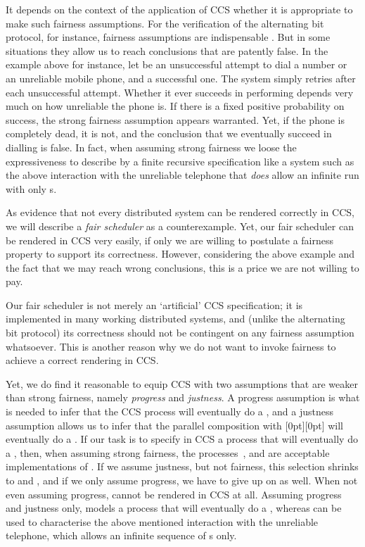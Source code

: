 \documentclass[smallcondensed]{svjour3}
\newcommand{\plat}[1]{\raisebox{0pt}[0pt][0pt]{#1}}  \def\precond#1{{\vphantom{#1}}^\bullet #1}
\begin{document}
\advance\textheight -1pt
It depends on the context of the application of CCS whether it is appropriate to make such fairness assumptions.
For the verification of the alternating bit protocol, for instance, fairness assumptions are
indispensable \cite{BergstraKlop85}. But in some situations they allow us to reach conclusions that are
patently false. In the example above for instance, let  be an unsuccessful attempt to dial a
number or an unreliable mobile phone, and  a successful one. The system  simply
retries after each unsuccessful attempt. Whether it ever succeeds in performing  depends very
much on how unreliable the phone is. If there is a fixed positive probability on success,
the strong fairness assumption appears warranted. Yet, if the phone is completely dead, it is not,
and the conclusion that we eventually succeed in dialling is false.
In fact, when assuming strong fairness we loose the expressiveness to describe by a finite
recursive specification like  a system such as the above interaction with the unreliable 
telephone that \emph{does} allow an infinite run with only s.

As evidence that not every distributed system can be rendered correctly in CCS, we will describe a
\emph{fair scheduler} as a counterexample. Yet, our fair scheduler can be rendered in CCS very
easily, if only we are willing to postulate a fairness property to support its correctness.
However, considering the above example and the fact that we 
may reach wrong conclusions, this is a price we are not willing to pay.

Our fair scheduler is not merely an `artificial' CCS specification; it is implemented in many working distributed systems, and (unlike the alternating bit
protocol) its correctness should not be contingent on any fairness assumption whatsoever.
This is another reason why we do not want to invoke fairness to achieve a correct rendering in CCS\@.

Yet, we do find it reasonable to equip CCS with two assumptions that are weaker than strong fairness,
namely \emph{progress} and \emph{justness}. A progress assumption is what is needed to infer that
the CCS process  will eventually do a , and a justness assumption allows us to infer that
the parallel composition  with \plat{} will eventually do a .
If our task is to specify in CCS a process  that will eventually do a ,
then, when assuming strong fairness,
the processes~,   and  are acceptable implementations of .
If we assume justness, but not fairness, this selection shrinks to  and , and if we only
assume progress, we have to give up on  as well. When not even assuming progress, 
cannot be rendered in CCS at all.
Assuming progress and justness only,  models a process that will
eventually do a , whereas  can be used to characterise the above mentioned interaction with the unreliable telephone,
which allows an infinite sequence of s only.
\end{document}

